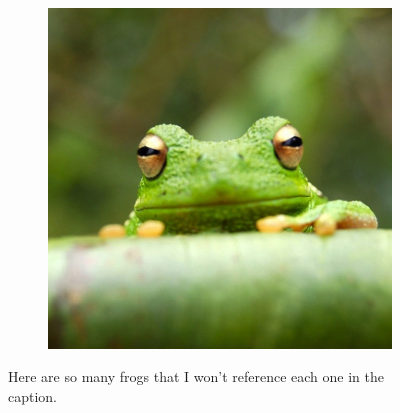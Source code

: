 \documentclass[twocolumn, 9pt]{extarticle}
\begin{document}
\begin{figure}[ht]
\begin{subfigure}[b]{0.1\linewidth}
    \caption{}
    \label{subfig:frog3q}
\end{subfigure}
\begin{subfigure}[b]{0.1\linewidth}
    \includegraphics[width=\linewidth]{frog.jpg}
    \caption{}
    \label{subfig:frog3r}
\end{subfigure}
\caption{Here are so many frogs that I won't reference each one in the caption.}
\label{fig:frog_20}
\end{figure}
\end{document}
